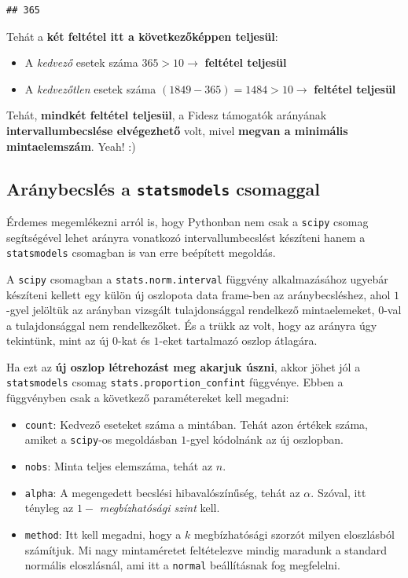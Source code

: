 \documentclass[
]{book}
\providecommand{\tightlist}{%
  \setlength{\itemsep}{0pt}\setlength{\parskip}{0pt}}
\begin{document}
\begin{verbatim}
## 365
\end{verbatim}

Tehát a \textbf{két feltétel itt a következőképpen teljesül}:

\begin{itemize}
\tightlist
\item
  A \emph{kedvező} esetek száma \(365 > 10 \rightarrow\) \textbf{feltétel teljesül}
\item
  A \emph{kedvezőtlen} esetek száma \((1849-365) = 1484 > 10 \rightarrow\) \textbf{feltétel teljesül}
\end{itemize}

Tehát, \textbf{mindkét feltétel teljesül}, a Fidesz támogatók arányának \textbf{intervallumbecslése elvégezhető} volt, mivel \textbf{megvan a minimális mintaelemszám}. Yeah! :)

\subsection{\texorpdfstring{Aránybecslés a \texttt{statsmodels} csomaggal}{Aránybecslés a statsmodels csomaggal}}\label{aruxe1nybecsluxe9s-a-statsmodels-csomaggal}

Érdemes megemlékezni arról is, hogy Pythonban nem csak a \texttt{scipy} csomag segítségével lehet arányra vonatkozó intervallumbecslést készíteni hanem a \texttt{statsmodels} csomagban is van erre beépített megoldás.

A \texttt{scipy} csomagban a \texttt{stats.norm.interval} függvény alkalmazásához ugyebár készíteni kellett egy külön új oszlopota data frame-ben az aránybecsléshez, ahol \(1\)-gyel jelöltük az arányban vizsgált tulajdonsággal rendelkező mintaelemeket, \(0\)-val a tulajdonsággal nem rendelkezőket. És a trükk az volt, hogy az arányra úgy tekintünk, mint az új \(0\)-kat és \(1\)-eket tartalmazó oszlop átlagára.

Ha ezt az \textbf{új oszlop létrehozást meg akarjuk úszni}, akkor jöhet jól a \texttt{statsmodels} csomag \texttt{stats.proportion\_confint} függvénye. Ebben a függvényben csak a következő paramétereket kell megadni:

\begin{itemize}
\tightlist
\item
  \texttt{count}: Kedvező eseteket száma a mintában. Tehát azon értékek száma, amiket a \texttt{scipy}-os megoldásban \(1\)-gyel kódolnánk az új oszlopban.
\item
  \texttt{nobs}: Minta teljes elemszáma, tehát az \(n\).
\item
  \texttt{alpha}: A megengedett becslési hibavalószínűség, tehát az \(\alpha\). Szóval, itt tényleg az \(1-\) \emph{megbízhatósági szint} kell.
\item
  \texttt{method}: Itt kell megadni, hogy a \(k\) megbízhatósági szorzót milyen eloszlásból számítjuk. Mi nagy mintaméretet feltételezve mindig maradunk a standard normális eloszlásnál, ami itt a \texttt{\textquotesingle{}normal\textquotesingle{}} beállításnak fog megfelelni.
\end{itemize}
\end{document}
